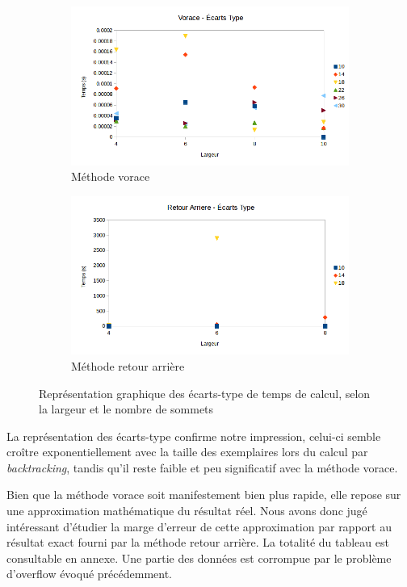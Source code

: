 \documentclass[10pt,a4paper]{article}
\begin{document}
\begin{figure}[h!]
	\begin{subfigure}[c]{0.5\textwidth}
		\centering
		\includegraphics[width=\textwidth]{spreadsheet/graph3}
		\caption{Méthode vorace}
	\end{subfigure}
	\begin{subfigure}[c]{0.5\textwidth}
		\centering
		\includegraphics[width=\textwidth]{spreadsheet/graph4}
		\caption{Méthode retour arrière}
	\end{subfigure}
	\caption{Représentation graphique des écarts-type de temps de calcul, selon la largeur et le nombre de sommets}
\end{figure}

La représentation des écarts-type confirme notre impression, celui-ci semble croître exponentiellement avec la taille des exemplaires lors du calcul par \textit{backtracking}, tandis qu'il reste faible et peu significatif avec la méthode vorace.

Bien que la méthode vorace soit manifestement bien plus rapide, elle repose sur une approximation mathématique du résultat réel. Nous avons donc jugé intéressant d'étudier la marge d'erreur de cette approximation par rapport au résultat exact fourni par la méthode retour arrière. La totalité du tableau est consultable en annexe. Une partie des données est corrompue par le problème d'overflow évoqué précédemment.
\end{document}

